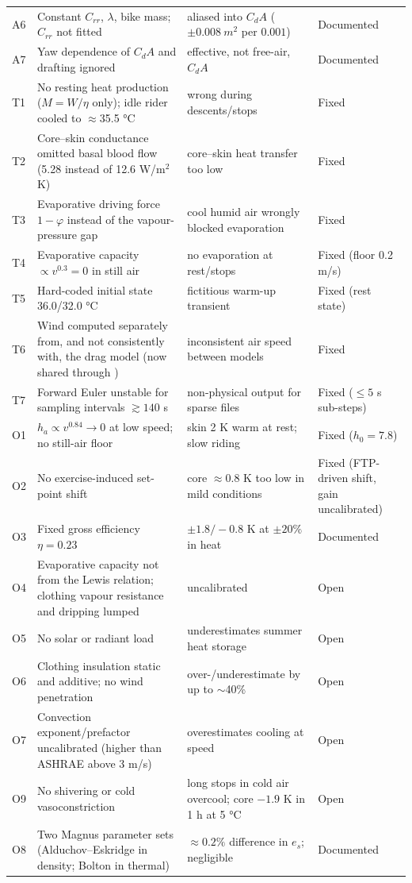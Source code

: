 \documentclass[11pt,a4paper]{article}
\newcommand{\code}[1]{\texttt{\detokenize{#1}}}
\newcommand{\CdA}{C_{\!d}A}
\begin{document}
{\begin{longtable}{@{}l>{\raggedright\arraybackslash}p{6.3cm}>{\raggedright\arraybackslash}p{4.6cm}>{\raggedright\arraybackslash}p{2.4cm}@{}}
A6 & Constant \(C_{rr}\), \(\lambda\), bike mass; \(C_{rr}\) not fitted & aliased into \(\CdA\) (\(\pm0.008\ \si{m^2}\) per \(0.001\)) & Documented \\
A7 & Yaw dependence of \(\CdA\) and drafting ignored & effective, not free-air, \(\CdA\) & Documented \\
\midrule
T1 & No resting heat production (\(M=W/\eta\) only); idle rider cooled to \(\approx\)35.5 \si{\degreeCelsius} & wrong during descents/stops & Fixed \\
T2 & Core--skin conductance omitted basal blood flow (5.28 instead of 12.6 W/m\(^2\)K) & core--skin heat transfer too low & Fixed \\
T3 & Evaporative driving force \(1-\varphi\) instead of the vapour-pressure gap & cool humid air wrongly blocked evaporation & Fixed \\
T4 & Evaporative capacity \(\propto v^{0.3}=0\) in still air & no evaporation at rest/stops & Fixed (floor 0.2 m/s) \\
T5 & Hard-coded initial state 36.0/32.0 \si{\degreeCelsius} & fictitious warm-up transient & Fixed (rest state) \\
T6 & Wind computed separately from, and not consistently with, the drag model (now shared through \code{apparent_air_speed}) & inconsistent air speed between models & Fixed \\
T7 & Forward Euler unstable for sampling intervals \(\gtrsim140\) s & non-physical output for sparse files & Fixed (\(\le5\) s sub-steps) \\
\midrule
O1 & \(h_a\propto v^{0.84}\to0\) at low speed; no still-air floor & skin 2 K warm at rest; slow riding & Fixed (\(h_0=7.8\)) \\
O2 & No exercise-induced set-point shift & core \(\approx0.8\) K too low in mild conditions & Fixed (FTP-driven shift, gain uncalibrated) \\
O3 & Fixed gross efficiency \(\eta=0.23\) & \(\pm1.8/-0.8\) K at \(\pm20\%\) in heat & Documented \\
O4 & Evaporative capacity not from the Lewis relation; clothing vapour resistance and dripping lumped & uncalibrated & Open \\
O5 & No solar or radiant load & underestimates summer heat storage & Open \\
O6 & Clothing insulation static and additive; no wind penetration & over-/underestimate by up to \(\sim\)40\% & Open \\
O7 & Convection exponent/prefactor uncalibrated (higher than ASHRAE above 3 m/s) & overestimates cooling at speed & Open \\
O9 & No shivering or cold vasoconstriction & long stops in cold air overcool; core \(-1.9\) K in 1 h at 5 \si{\degreeCelsius} & Open \\
O8 & Two Magnus parameter sets (Alduchov--Eskridge in density; Bolton in thermal) & \(\approx0.2\%\) difference in \(e_s\); negligible & Documented \\
\end{longtable}}
\end{document}
